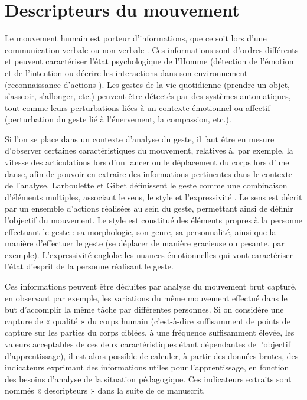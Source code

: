 \chapter{Descripteurs du mouvement}\label{chap:descripteurs}
Le mouvement humain est porteur d'informations, que ce soit lors d'une communication verbale \parencite{Huang2015SLR} ou non-verbale \parencite{Chang2013Pea}. Ces informations sont d'ordres différents et peuvent caractériser l'état psychologique de l'Homme (détection de l'émotion \parencite{Yuichi2007TEa} et de l'intention \parencite{Yu2015Hmb} ou décrire les interactions dans son environnement (reconnaissance d'actions \parencite{Kapsouras2014Aro}). Les gestes de la vie quotidienne (prendre un objet, s'asseoir, s'allonger, etc.) peuvent être détectés par des systèmes automatiques, tout comme leurs perturbations liées à un contexte émotionnel ou affectif (perturbation du geste lié à l'énervement, la compassion, etc.).

Si l'on se place dans un contexte d'analyse du geste, il faut être en mesure d'observer certaines caractéristiques du mouvement, relatives à, par exemple, la vitesse des articulations lors d'un lancer ou le déplacement du corps lors d'une danse, afin de pouvoir en extraire des informations pertinentes dans le contexte de l'analyse. Larboulette et Gibet définissent le geste comme une combinaison d'éléments multiples, associant le sens, le style et l'expressivité \parencite{larboulette2015Descriptors}. Le sens est décrit par un ensemble d'actions réalisées au sein du geste, permettant ainsi de définir l'objectif du mouvement. Le style est constitué des éléments propres à la personne effectuant le geste : sa morphologie, son genre, sa personnalité, ainsi que la manière d'effectuer le geste (se déplacer de manière gracieuse ou pesante, par exemple). L'expressivité englobe les nuances émotionnelles qui vont caractériser l'état d'esprit de la personne réalisant le geste.

Ces informations peuvent être déduites par analyse du mouvement brut capturé, en observant par exemple, les variations du même mouvement effectué dans le but d'accomplir la même tâche par différentes personnes. Si on considère une capture de « qualité » du corps humain (c'est-à-dire suffisamment de points de capture sur les parties du corps ciblées, à une fréquence suffisamment élevée, les valeurs acceptables de ces deux caractéristiques étant dépendantes de l'objectif d'apprentissage), il est alors possible de calculer, à partir des données brutes, des indicateurs exprimant des informations utiles pour l'apprentissage, en fonction des besoins d'analyse de la situation pédagogique. Ces indicateurs extraits sont nommés « descripteurs » dans la suite de ce manuscrit.


